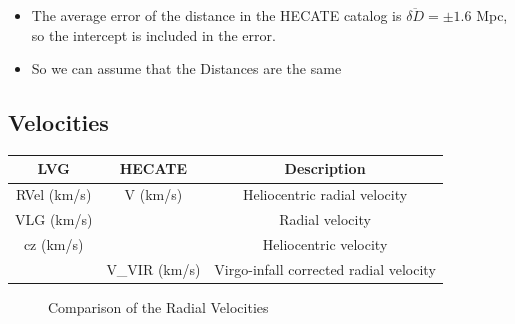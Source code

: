 \documentclass[
]{article}
\providecommand{\tightlist}{%
  \setlength{\itemsep}{0pt}\setlength{\parskip}{0pt}}\usepackage{longtable,booktabs,array}
\begin{document}
\begin{itemize}
\tightlist
\item
  The average error of the distance in the HECATE catalog is
  \(\overline{\delta D} = \pm 1.6\) Mpc, so the intercept is included in
  the error.
\item
  So we can assume that the Distances are the same
\end{itemize}

\subsection{Velocities}\label{velocities}

\begin{longtable}[]{@{}ccc@{}}
\toprule\noalign{}
LVG & HECATE & Description \\
\midrule\noalign{}
\endhead
\bottomrule\noalign{}
\endlastfoot
RVel (km/s) & V (km/s) & Heliocentric radial velocity \\
VLG (km/s) & & Radial velocity \\
cz (km/s) & & Heliocentric velocity \\
& V\_VIR (km/s) & Virgo-infall corrected radial velocity \\
\end{longtable}

\begin{figure}


\caption{\label{fig-vel-compare}Comparison of the Radial Velocities}

\end{figure}%
\end{document}
